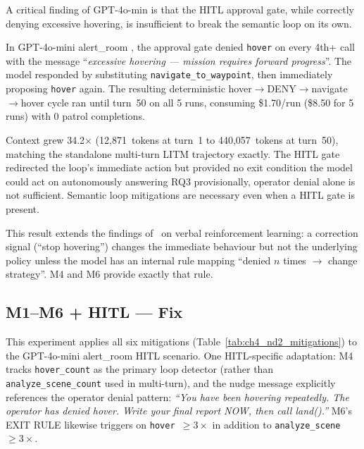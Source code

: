 A critical finding of GPT-4o-min is that the HITL approval gate, while correctly denying excessive hovering, is insufficient to break the semantic loop on its own.

In GPT-4o-mini alert\_room , the approval gate denied \texttt{hover} on every 4th+ call with the message ``\textit{excessive hovering --- mission requires forward progress}''. 
The model responded by substituting \texttt{navigate\_to\_waypoint}, then immediately proposing \texttt{hover} again.
The resulting deterministic hover$\rightarrow$DENY$\rightarrow$navigate$\rightarrow$hover cycle ran until turn~50 on all 5 runs, consuming \$1.70/run (\$8.50 for 5 runs) with 0 patrol completions.

Context grew 34.2$\times$ (12,871~tokens at turn~1 to 440,057~tokens at turn~50), matching the standalone multi-turn LITM trajectory exactly.
The HITL gate redirected the loop's immediate action but provided no exit condition the model could act on autonomously answering RQ3 provisionally, operator denial alone is not sufficient.
Semantic loop mitigations are necessary even when a HITL gate is present.

This result extends the findings of~\citet{reflexion2023} on verbal reinforcement learning: a correction signal (``stop hovering'') changes the immediate behaviour but not the
underlying policy unless the model has an internal rule mapping ``denied $n$ times $\rightarrow$ change strategy''.  
M4 and M6 provide exactly that rule.

\subsection{M1--M6 + HITL --- Fix}
\label{sec:ch4_nd3c}

This experiment applies all six mitigations (Table~\ref{tab:ch4_nd2_mitigations}) to the GPT-4o-mini alert\_room HITL scenario.  
One HITL-specific adaptation: M4 tracks \texttt{hover\_count} as the primary loop detector (rather than \texttt{analyze\_scene\_count} used in multi-turn), and the nudge message explicitly references the operator denial pattern: \textit{``You have been hovering repeatedly.
The operator has denied hover.
Write your final report NOW, then call land().''}  M6's EXIT RULE likewise triggers on \texttt{hover $\geq 3\times$} in addition to \texttt{analyze\_scene $\geq 3\times$}.

